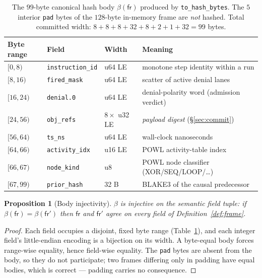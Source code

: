\documentclass[11pt,oneside]{book}
\theoremstyle{definition}
\theoremstyle{plain}
\newtheorem{proposition}[theorem]{Proposition}
\theoremstyle{remark}
\newcommand{\fr}{\mathsf{fr}}                   %
\newcommand{\body}{\beta}                       %
\newcommand{\code}[1]{\texttt{#1}}
\begin{document}
\begin{table}[t]
\centering
\begin{tabular}{llll}
\toprule
Byte range & Field & Width & Meaning\\
\midrule
$[0,8)$   & \code{instruction\_id} & u64 LE & monotone step identity within a run\\
$[8,16)$  & \code{fired\_mask}     & u64 LE & scatter of active denial lanes\\
$[16,24)$ & \code{denial.0}        & u64 LE & denial-polarity word (admission verdict)\\
$[24,56)$ & \code{obj\_refs}       & $8\times$ u32 LE & \emph{payload digest} (\S\ref{sec:commit})\\
$[56,64)$ & \code{ts\_ns}          & u64 LE & wall-clock nanoseconds\\
$[64,66)$ & \code{activity\_idx}   & u16 LE & POWL activity-table index\\
$[66,67)$ & \code{node\_kind}      & u8     & POWL node classifier (XOR/SEQ/LOOP/\dots)\\
$[67,99)$ & \code{prior\_hash}     & 32 B   & BLAKE3 of the causal predecessor\\
\bottomrule
\end{tabular}
\caption{The $99$-byte canonical hash body $\body(\fr)$ produced by \code{to\_hash\_bytes}. %
The $5$ interior \code{pad} bytes of the $128$-byte in-memory frame are \emph{not} hashed. %
Total committed width: $8+8+8+32+8+2+1+32=99$ bytes.} %
\label{tab:layout}
\end{table}

\begin{proposition}[Body injectivity]\label{prop:bodyinj}
$\body$ is injective on the semantic field tuple: if $\body(\fr)=\body(\fr')$ then $\fr$ and
$\fr'$ agree on every field of Definition~\ref{def:frame}. %
\end{proposition}

\begin{proof}
Each field occupies a disjoint, fixed byte range (Table~\ref{tab:layout}), and each
integer field's little-endian encoding is a bijection on its width. %
A byte-equal body forces
range-wise equality, hence field-wise equality. %
The \code{pad} bytes are absent from the
body, so they do not participate; two frames differing only in padding have equal bodies,
which is correct --- padding carries no consequence. %
 \end{proof}
\end{document}
